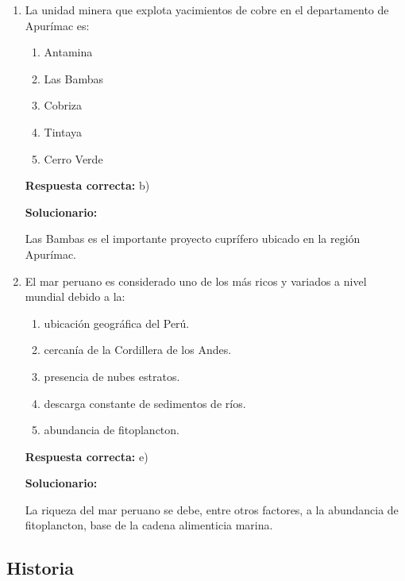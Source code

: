 \begin{enumerate}[resume]
	
	\item La unidad minera que explota yacimientos de cobre en el departamento de Apurímac es:
	\begin{enumerate}[label=\alph*)]
		\item Antamina
		\item Las Bambas
		\item Cobriza
		\item Tintaya
		\item Cerro Verde
	\end{enumerate}
	\textbf{Respuesta correcta:} b)
	
	\vspace{2mm}
	\textbf{Solucionario:}
	
	Las Bambas es el importante proyecto cuprífero ubicado en la región Apurímac.
	
	\vspace{6mm}
	
	\item El mar peruano es considerado uno de los más ricos y variados a nivel mundial debido a la:
	\begin{enumerate}[label=\alph*)]
		\item ubicación geográfica del Perú.
		\item cercanía de la Cordillera de los Andes.
		\item presencia de nubes estratos.
		\item descarga constante de sedimentos de ríos.
		\item abundancia de fitoplancton.
	\end{enumerate}
	\textbf{Respuesta correcta:} e)
	
	\vspace{2mm}
	\textbf{Solucionario:}
	
	La riqueza del mar peruano se debe, entre otros factores, a la abundancia de fitoplancton, base de la cadena alimenticia marina.
	
	\vspace{6mm}
	
\end{enumerate}

\subsection*{Historia}

